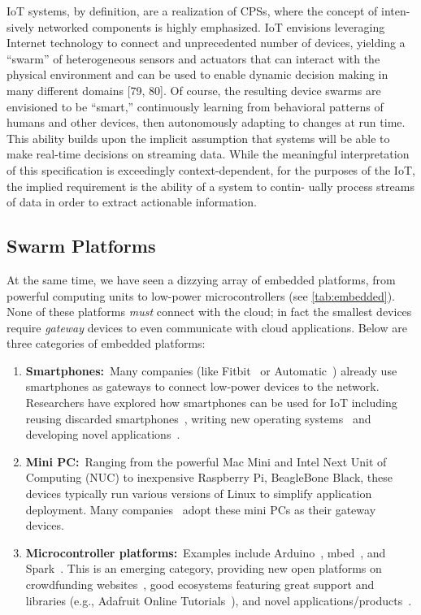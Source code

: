 IoT systems, by definition, are a realization of CPSs, where the concept of
inten- sively networked components is highly emphasized. IoT envisions
leveraging Internet technology to connect and unprecedented number of devices,
yielding a “swarm” of heterogeneous sensors and actuators that can interact with
the physical environment and can be used to enable dynamic decision making in
many different domains [79, 80]. Of course, the resulting device swarms are
envisioned to be “smart,” continuously learning from behavioral patterns of
humans and other devices, then autonomously adapting to changes at run
time. This ability builds upon the implicit assumption that systems will be able
to make real-time decisions on streaming data. While the meaningful
interpretation of this specification is exceedingly context-dependent, for the
purposes of the IoT, the implied requirement is the ability of a system to
contin- ually process streams of data in order to extract actionable
information.

\subsection{Swarm Platforms}
\label{sec:swarm-platforms}


At the same time, we have seen a dizzying array of embedded platforms, from
powerful computing units to low-power microcontrollers (see
\autoref{tab:embedded}). None of these platforms \emph{must} connect with the
cloud; in fact the smallest devices require \emph{gateway} devices to even
communicate with cloud applications. Below are three categories of embedded
platforms:

\begin{enumerate}
\item \textbf{Smartphones:}~Many companies (like Fitbit~\cite{fitbit} or
  Automatic~\cite{automatic}) already use smartphones as gateways to connect
  low-power devices to the network.  Researchers have explored how smartphones
  can be used for IoT including reusing discarded
  smartphones~\cite{challen2014mote}, writing new operating systems~\cite{janos}
  and developing novel applications~\cite{hong2014smartphone}.

\item \textbf{Mini PC:}~Ranging from the powerful Mac Mini and Intel Next Unit
  of Computing (NUC) to inexpensive Raspberry Pi, BeagleBone Black, these
  devices typically run various versions of Linux to simplify application
  deployment.  Many companies~\cite{ninja, smartthings, wink} adopt these mini
  PCs as their gateway devices.

\item \textbf{Microcontroller platforms:}~Examples include
  Arduino~\cite{arduino}, mbed~\cite{mbed}, and Spark~\cite{spark}. This is an
  emerging category, providing new open platforms on crowdfunding
  websites~\cite{kickstarter}, good ecosystems featuring great support and
  libraries (e.g., Adafruit Online Tutorials~\cite{adafruit}), and novel
  applications/products~\cite{iotlist}.

\end{enumerate}

